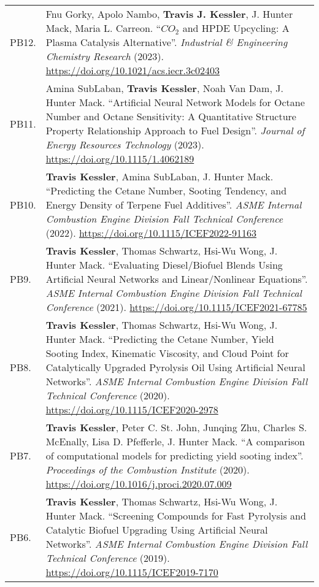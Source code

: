 \documentclass{letter}
\begin{document}
    \renewcommand{\arraystretch}{1.5}
    \begin{tabular*}{\linewidth}{p{0.08\linewidth} p{0.92\linewidth}}
        PB12. & Fnu Gorky, Apolo Nambo, \textbf{Travis J. Kessler}, J. Hunter Mack, Maria L. Carreon. “$ CO_2 $ and HPDE Upcycling: A Plasma Catalysis Alternative”. \textit{Industrial \& Engineering Chemistry Research} (2023). \url{https://doi.org/10.1021/acs.iecr.3c02403} \\
        PB11. & Amina SubLaban, \textbf{Travis Kessler}, Noah Van Dam, J. Hunter Mack. “Artificial Neural Network Models for Octane Number and Octane Sensitivity: A Quantitative Structure Property Relationship Approach to Fuel Design”. \textit{Journal of Energy Resources Technology} (2023). \url{https://doi.org/10.1115/1.4062189} \\
        PB10. & \textbf{Travis Kessler}, Amina SubLaban, J. Hunter Mack. “Predicting the Cetane Number, Sooting Tendency, and Energy Density of Terpene Fuel Additives”. \textit{ASME Internal Combustion Engine Division Fall Technical Conference} (2022). \url{https://doi.org/10.1115/ICEF2022-91163} \\
        PB9. & \textbf{Travis Kessler}, Thomas Schwartz, Hsi-Wu Wong, J. Hunter Mack. “Evaluating Diesel/Biofuel Blends Using Artificial Neural Networks and Linear/Nonlinear Equations”. \textit{ASME Internal Combustion Engine Division Fall Technical Conference} (2021). \url{https://doi.org/10.1115/ICEF2021-67785} \\
        PB8. & \textbf{Travis Kessler}, Thomas Schwartz, Hsi-Wu Wong, J. Hunter Mack. “Predicting the Cetane Number, Yield Sooting Index, Kinematic Viscosity, and Cloud Point for Catalytically Upgraded Pyrolysis Oil Using Artificial Neural Networks”. \textit{ASME Internal Combustion Engine Division Fall Technical Conference} (2020). \url{https://doi.org/10.1115/ICEF2020-2978} \\
        PB7. & \textbf{Travis Kessler}, Peter C. St. John, Junqing Zhu, Charles S. McEnally, Lisa D. Pfefferle, J. Hunter Mack. “A comparison of computational models for predicting yield sooting index”. \textit{Proceedings of the Combustion Institute} (2020). \url{https://doi.org/10.1016/j.proci.2020.07.009} \\
        PB6. & \textbf{Travis Kessler}, Thomas Schwartz, Hsi-Wu Wong, J. Hunter Mack. “Screening Compounds for Fast Pyrolysis and Catalytic Biofuel Upgrading Using Artificial Neural Networks”. \textit{ASME Internal Combustion Engine Division Fall Technical Conference} (2019). \url{https://doi.org/10.1115/ICEF2019-7170} \\

\end{tabular*}
\end{document}
